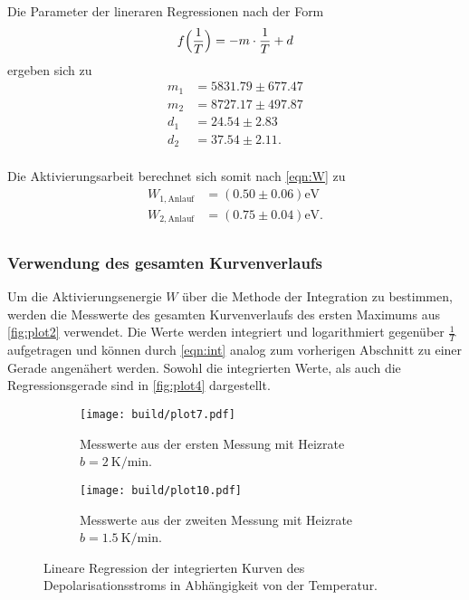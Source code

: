 Die Parameter der lineraren Regressionen nach der Form
\begin{equation}
  f\Bigl(\frac{1}{T}\Bigr)= -m\cdot \frac{1}{T} +d
\end{equation}
ergeben sich zu
\begin{align*}
  m_1 &= 5831.79 \pm 677.47 \\
  m_2 &= 8727.17 \pm 497.87\\
  d_1 &= 24.54 \pm 2.83\\
  d_2 &= 37.54 \pm 2.11.\\
\end{align*}

Die Aktivierungsarbeit berechnet sich somit nach \autoref{eqn:W} zu
\begin{align*}
  W_{1,\text{Anlauf}} &= (0.50 \pm 0.06) \unit{\electronvolt}\\
  W_{2,\text{Anlauf}} &= (0.75 \pm 0.04) \unit{\electronvolt}.\\
\end{align*} 

\subsubsection{Verwendung des gesamten Kurvenverlaufs}

Um die Aktivierungsenergie $W$ über die Methode der Integration zu bestimmen, werden die Messwerte des gesamten Kurvenverlaufs des ersten 
Maximums aus \autoref{fig:plot2} verwendet.
Die Werte werden integriert und logarithmiert gegenüber $\frac{1}{T}$ aufgetragen und können durch \autoref{eqn:int} analog zum vorherigen
Abschnitt zu einer Gerade angenähert werden.
Sowohl die integrierten Werte, als auch die Regressionsgerade sind in \autoref{fig:plot4} dargestellt.

\begin{figure}[H]
  \begin{subfigure}{\textwidth}
  \centering
  \texttt{[image: build/plot7.pdf]}
  \caption{Messwerte aus der ersten Messung mit Heizrate $b=\qty{2}{\kelvin\per\minute}$.}
  \label{fig:plot4a}
  \end{subfigure}
  \hfill
  \begin{subfigure}{\textwidth}
  \centering
  \texttt{[image: build/plot10.pdf]}
  \caption{Messwerte aus der zweiten Messung mit Heizrate $b=\qty{1.5}{\kelvin\per\minute}$.}
  \label{fig:plot4b}
  \end{subfigure}
  \caption{Lineare Regression der integrierten Kurven des Depolarisationsstroms in Abhängigkeit von der Temperatur.}
  \label{fig:plot4}
\end{figure}

